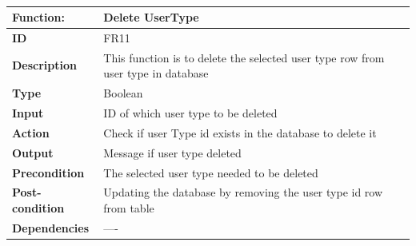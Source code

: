 \documentclass[]{article}
\begin{document}
\FloatBarrier
\begin{table}[h]
\caption{}
\label{tab:my-table}
\begin{tabular}{|p{}|p{}|}
\hline
\textbf{Function:} & Delete UserType 
\\ \hline
\textbf{ID}  & FR11          

\\ \hline
\textbf{Description}  & This function is to delete the selected user type row from user type in database                                                                     
\\ \hline
\textbf{Type}   & Boolean         

\\ \hline
\textbf{Input}  & ID of which user type to be deleted 

\\ \hline
\textbf{Action} & Check if user Type id exists in the database to delete it 

\\ \hline
\textbf{Output}  & Message if user type deleted  

\\ \hline
\textbf{Precondition}   & The selected user type needed to be deleted   

\\ \hline
\textbf{Post-condition}  & Updating the database by removing the user type id row from table 

\\ \hline
\textbf{Dependencies}    & ---- 
\\ \hline
\end{tabular}
\end{table}
\end{document}

